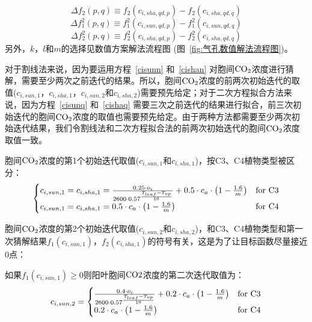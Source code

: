 \begin{equation}
\Delta f_2 \left(p,q\right)\equiv f_2(c_{i,sha,qd,p})-f_2(c_{i,sha,qd,q})
\end{equation}
\begin{equation}
\Delta f^2_1 \left(p,q\right)\equiv f^2_1(c_{i,sun,qd,p})-f^2_1(c_{i,sun,qd,q})
\end{equation}
\begin{equation}
\Delta f^2_2 \left(p,q\right)\equiv f^2_2(c_{i,sha,qd,p})-f^2_2(c_{i,sha,qd,q})
\end{equation}
另外，$k$，$l$和$m$的选择见数值方案解法流程图 (图~\ref{fig:气孔数值解法流程图})。

对于割线法来说，因为要运用方程~\eqref{cisunn} 和~\eqref{cishan} 对胞间$\rm CO_2$浓度进行猜解，需要至少两次之前迭代的结果。所以，胞间$\rm CO_2$浓度的前两次初始迭代的取值($c_{i,sun,1}$，$c_{i,sha,1}$，$c_{i,sun,2}$和$c_{i,sha,2}$)需要预先给定；对于二次方程拟合方法来说，因为方程~\eqref{cisunq} 和~\eqref{cishaq} 需要三次之前迭代的结果进行拟合，前三次初始迭代的胞间$\rm CO_2$浓度的取值也需要预先给定。由于两种方法都需要至少两次初始迭代结果，我们令割线法和二次方程拟合法的前两次初始迭代的胞间$\rm CO_2$浓度取值一致。

胞间$\rm CO_2$浓度的第1个初始迭代取值($c_{i,sun,1}$和$c_{i,sha,1}$)，按C3、C4植物类型被区分：
\begin{align}\label{ci_1}
\begin{cases}
c_{i,sun,1}=c_{i,sha,1}=\frac{0.25 \cdot o_{i}} {2600 \cdot 0.57 ^\frac{T_{{leaf }} -  T_{o p}}{10}} + 0.5\cdot c_{a}\cdot\left(1-\frac{1.6}{m}\right) &\rm for\,\, C3\\
c_{i,sun,1}=c_{i,sha,1}=0.5\cdot c_{a}\cdot\left(1-\frac{1.6}{m}\right)   &\rm for\,\, C4
\end{cases}
\end{align}

胞间$\rm CO_2$浓度的第2个初始迭代取值($c_{i,sun,2}$和$c_{i,sha,2}$)，和C3、C4植物类型和第一次猜解结果$f_{1}\left(c_{i,sun,1}\right)$，$f_{2}\left(c_{i,sha,1}\right)$的符号有关，这是为了让目标函数尽量接近0点：

如果$f_{1}\left(c_{i,sun,1}\right)\geqslant 0$则阳叶胞间$\rm CO2$浓度的第二次迭代取值为：
\begin{align}\label{cisun_2_fp}
c_{i,sun,2}=
\begin{cases}
\frac{0.4 \cdot o_{i}} {2600 \cdot 0.57 ^\frac{T_{{leaf }} -  T_{o p}}{10}} + 0.2\cdot c_{a}\cdot\left(1-\frac{1.6}{m}\right)  &\rm for\,\, C3\\
0.2\cdot c_{a}\cdot\left(1-\frac{1.6}{m}\right) &\rm for\,\, C4
\end{cases}
\end{align}

